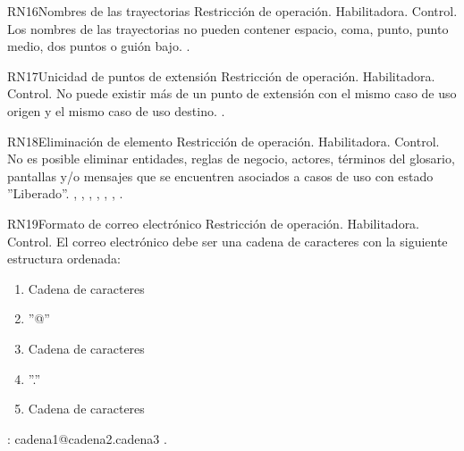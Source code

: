 \begin{BussinesRule}{RN16}{Nombres de las trayectorias} 
	\BRitem[Tipo:] Restricción de operación. 
	\BRitem[Clase:] Habilitadora. 
	\BRitem[Nivel:] Control. %
	\BRitem[Descripción:] Los nombres de las trayectorias no pueden contener espacio, coma, punto, punto medio, dos puntos o guión bajo.
	 \UCref{}{}. 
\end{BussinesRule}


\begin{BussinesRule}{RN17}{Unicidad de puntos de extensión} 
	\BRitem[Tipo:] Restricción de operación. 
	\BRitem[Clase:] Habilitadora. 
	\BRitem[Nivel:] Control. %
	\BRitem[Descripción:] No puede existir más de un punto de extensión con el mismo caso de uso origen y el mismo caso de uso destino.
	 \UCref{}{}. 
\end{BussinesRule}


\begin{BussinesRule}{RN18}{Eliminación de elemento} 
	\BRitem[Tipo:] Restricción de operación. 
	\BRitem[Clase:] Habilitadora. 
	\BRitem[Nivel:] Control. %
	\BRitem[Descripción:] No es posible eliminar entidades, reglas de negocio, actores, términos del glosario, pantallas y/o mensajes que se encuentren asociados a casos de uso con estado ''Liberado''.
	 , , , , , , . 
\end{BussinesRule}

\begin{BussinesRule}{RN19}{Formato de correo electrónico} 
	\BRitem[Tipo:] Restricción de operación. 
	\BRitem[Clase:] Habilitadora. 
	\BRitem[Nivel:] Control. %
	\BRitem[Descripción:] El correo electrónico debe ser una cadena de caracteres con la siguiente estructura ordenada:
	\begin{enumerate}
		\item Cadena de caracteres
		\item ''@''
		\item Cadena de caracteres
		\item ''.''
		\item Cadena de caracteres
	\end{enumerate}
	\BRitem[Ejemplo]: cadena1@cadena2.cadena3
	 \UCref{}{}. 
\end{BussinesRule}

